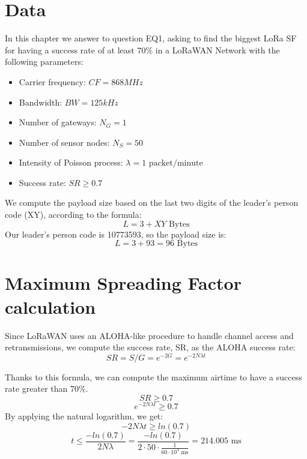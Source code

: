 \section{Data}
In this chapter we answer to question EQ1, asking to find the biggest LoRa SF for
having a success rate of at least 70\% in a LoRaWAN Network with the following parameters:
\begin{itemize}
\item Carrier frequency: $CF = 868 MHz$
\item Bandwidth: $BW = 125 kHz$
\item Number of gateways: $N_{G} = 1$
\item Number of sensor nodes: $N_{S} = 50$
\item Intensity of Poisson process: $\lambda = 1 \text{ packet/minute}$
\item Success rate: $SR \geq 0.7$
\end{itemize}

We compute the payload size based on the last two digits of the leader's person code (XY), according to the formula:
\begin{equation}
L = 3 + XY \text{ Bytes}
\end{equation}
Our leader's person code is 10773593, so the payload size is:
\begin{equation}
L = 3 + 93 = 96 \text{ Bytes}
\end{equation}

\section{Maximum Spreading Factor calculation}
Since LoRaWAN uses an ALOHA-like procedure to handle channel access and
retransmissions, we compute the success rate, SR, as the ALOHA success rate:
\begin{equation}
SR = S / G = e^{-2 G} = e^{-2 N \lambda t}
\end{equation}

Thanks to this formula, we can compute the maximum airtime to have a success rate greater than 70\%.
\begin{equation}
SR \geq 0.7
\end{equation}
\begin{equation}
e^{-2 N \lambda t} \geq 0.7
\end{equation}
By applying the natural logarithm, we get:
\begin{equation}
-2 N \lambda t \geq ln(0.7)
\end{equation}
\begin{equation}
t \leq \frac{-ln(0.7)}{2 N \lambda} = \frac{-ln(0.7)}{2 \cdot 50 \cdot \frac{1}{60 \cdot 10^3 \text{ ms}}} = 214.005 \text{ ms}
\end{equation}

